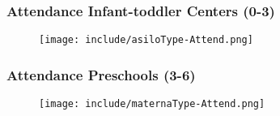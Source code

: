 \documentclass{beamer}
\begin{document}
%
%
\begin{frame}
\frametitle{Attendance Infant-toddler Centers (0-3)} 
\begin{center}
\begin{figure}
\texttt{[image: include/asiloType-Attend.png]}
\end{figure}
\end{center}
\end{frame}
\begin{frame}
\frametitle{Attendance Preschools (3-6)} 
\begin{center}
\begin{figure}
\texttt{[image: include/maternaType-Attend.png]}
\end{figure}
\end{center}
\end{frame}
\end{document}
